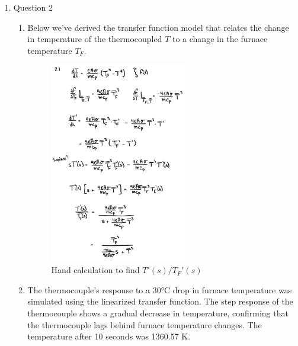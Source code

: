 \documentclass[12pt]{article}
\begin{document}
\begin{enumerate}
\begin{enumerate}
  \end{enumerate}

\pagebreak

\item Question 2
  \begin{enumerate}
    \item
    Below we've derived the transfer function model that relates the change in temperature of the thermocoupled $T$ to a change in the furnace temperature $T_F$.

    \begin{figure}[H]
      \centering
      \includegraphics[width=0.6\textwidth]{Figures/handcalc/q2-1.png}
      \caption{Hand calculation to find $T'(s)/T_F'(s)$}
      \label{fig:figure21} 
    \end{figure}

  
    \item
    The thermocouple's response to a 30°C drop in furnace temperature was simulated using the linearized transfer function. 
    The step response of the thermocouple shows a gradual decrease in temperature, confirming that the thermocouple lags behind furnace temperature changes.
    The temperature after 10 seconds was 1360.57 K.


\end{enumerate}
\end{enumerate}
\end{document}
